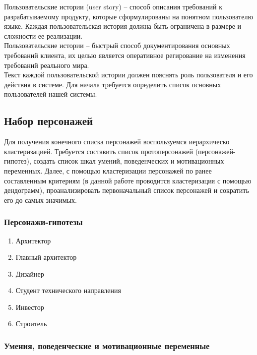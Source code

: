 \documentclass[a4paper,14pt]{extreport} %
\begin{document}
Пользовательские истории (user story) -- способ описания требований к разрабатываемому продукту, которые сформулированы на понятном пользователю языке. Каждая пользовательская история должна быть ограничена в размере и сложности ее реализации. \\
Пользовательские истории -- быстрый способ документирования основных требований клиента, их целью является оперативное регирование на изменения требований реального мира. \\
Текст каждой пользовательской истории должен пояснять роль пользователя и его действия в системе. Для начала требуется определить список основных пользователей нашей системы.

\subsection{Набор персонажей}

Для получения конечного списка персонажей воспользуемся иерархическо кластеризацией. Требуется составить список протоперсонажей (персонажей-гипотез), создать список шкал умений, поведенческих и мотивационных переменных. Далее, с помощью кластеризации персонажей по ранее составленным критериям (в данной работе проводится кластеризация с помощью дендограмм), проанализировать первоначальный список персонажей и сократить его до самых значимых.

\subsubsection{Персонажи-гипотезы}
\begin{enumerate}
\item Архитектор
\item Главный архитектор
\item Дизайнер
\item Студент технического направления
\item Инвестор
\item Строитель
\end {enumerate}

\subsubsection{Умения, поведенческие и мотивационные переменные}
\end{document}
